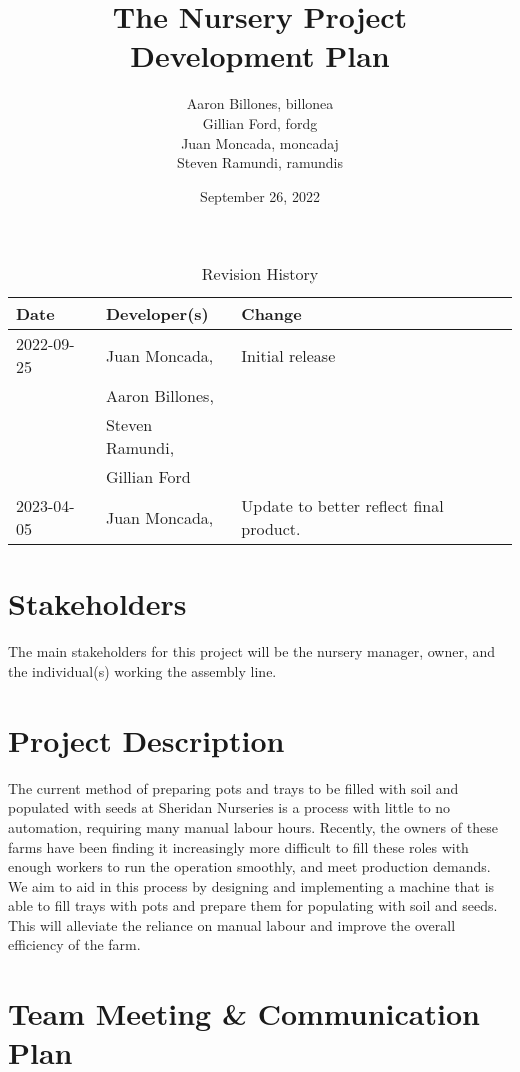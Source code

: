 \documentclass{article}
\title{The Nursery Project\\ Development Plan}
\author{Aaron Billones, billonea\\Gillian Ford, fordg\\Juan Moncada, moncadaj\\Steven Ramundi, ramundis}
\date{September 26, 2022}
\begin{document}
\maketitle

\begin{table}[hp]
	\caption{Revision History} \label{TblRevisionHistory}
	\begin{tabularx}{\textwidth}{llX}
	\toprule
	\textbf{Date} & \textbf{Developer(s)} & \textbf{Change}\\
	\midrule
	2022-09-25 & Juan Moncada,& Initial release\\&Aaron Billones,\\&Steven Ramundi,\\&Gillian Ford \\
	2023-04-05 & Juan Moncada,& Update to better reflect final product. \\
	
	\bottomrule
	\end{tabularx}
	\end{table}

	\newpage
	
	\section{Stakeholders}
	The main stakeholders for this project will be the nursery manager, 
	owner, and the individual(s) working the assembly line.
	
	\section{Project Description} 
	The current method of preparing pots and trays to be filled with soil and populated with seeds at Sheridan Nurseries is a process with little to no automation, requiring many manual labour hours. Recently, the owners of these farms have been finding it increasingly more difficult to fill these roles with enough workers to run the operation smoothly, and meet production demands. We aim to aid in this process by designing and implementing a machine that is able to fill trays with pots and prepare them for populating with soil and seeds. This will alleviate the reliance on manual labour and improve the overall efficiency of the farm.

	\section{Team Meeting \& Communication Plan}
	
\end{document}

